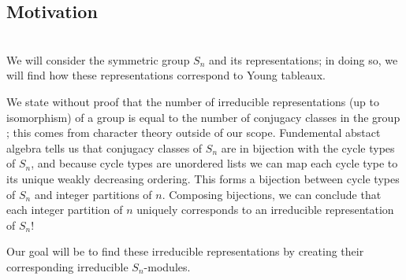 \documentclass[12pt,twoside]{reedthesis}
\theoremstyle{plain}   %
\theoremstyle{definition}
\theoremstyle{remark}
\numberwithin{equation}{section}
\begin{document}
   \subsection{Motivation}\label{motivation} \hfill\\
   We will consider the symmetric group $S_n$ and its representations; in doing so, we will find how these representations correspond to Young tableaux. \par
   We state without proof that the number of irreducible representations (up to isomorphism) of a group is equal to the number of conjugacy classes in
   the group \cite[Proposition 1.10.1]{sagan}; this comes from character theory outside of our scope. Fundemental abstact algebra tells us that 
   conjugacy classes of $S_n$ are in bijection with the cycle types of $S_n$,
   and because cycle types are unordered lists we can map each cycle type to its unique weakly decreasing ordering.
   This forms a bijection between cycle types of $S_n$ and integer partitions of $n$.
   Composing bijections, we can conclude that each integer partition of $n$ uniquely corresponds to an irreducible representation of $S_n$! \par
   Our goal will be to find these irreducible representations by creating their corresponding irreducible $S_n$-modules.
\end{document}
